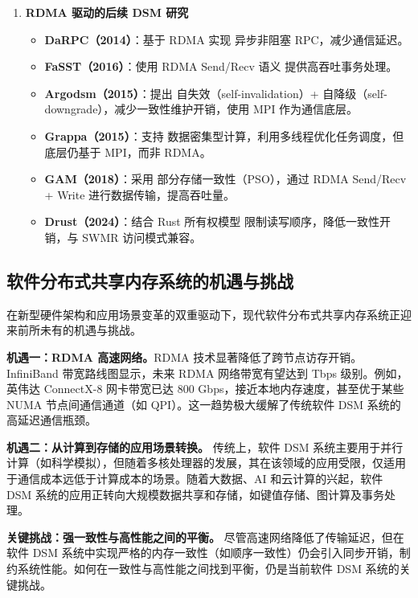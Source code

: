 {\begin{enumerate}[leftmargin=1em, align=left]
    \item \textbf{RDMA 驱动的后续 DSM 研究}

          \begin{itemize}
            \item \textbf{DaRPC（2014）}：基于 RDMA 实现 异步非阻塞 RPC，减少通信延迟。
            \item \textbf{FaSST（2016）}：使用 RDMA Send/Recv 语义 提供高吞吐事务处理。
            \item \textbf{Argodsm（2015）}：提出 自失效（self-invalidation）+ 自降级（self-downgrade），减少一致性维护开销，使用 MPI 作为通信底层。
            \item \textbf{Grappa（2015）}：支持 数据密集型计算，利用多线程优化任务调度，但底层仍基于 MPI，而非 RDMA。
            \item \textbf{GAM（2018）}：采用 部分存储一致性（PSO），通过 RDMA Send/Recv + Write 进行数据传输，提高吞吐量。
            \item \textbf{Drust（2024）}：结合 Rust 所有权模型 限制读写顺序，降低一致性开销，与 SWMR 访问模式兼容。
          \end{itemize}

  \end{enumerate}

  \subsection{软件分布式共享内存系统的机遇与挑战}
  在新型硬件架构和应用场景变革的双重驱动下，现代软件分布式共享内存系统正迎来前所未有的机遇与挑战。

  \textbf{机遇一：RDMA 高速网络。}RDMA 技术显著降低了跨节点访存开销。InfiniBand 带宽路线图显示，未来 RDMA 网络带宽有望达到 Tbps 级别。例如，英伟达 ConnectX-8 网卡带宽已达 800 Gbps，接近本地内存速度，甚至优于某些 NUMA 节点间通信通道（如 QPI）。这一趋势极大缓解了传统软件 DSM 系统的高延迟通信瓶颈。

  \textbf{机遇二：从计算到存储的应用场景转换。} 传统上，软件 DSM 系统主要用于并行计算（如科学模拟），但随着多核处理器的发展，其在该领域的应用受限，仅适用于通信成本远低于计算成本的场景。随着大数据、AI 和云计算的兴起，软件 DSM 系统的应用正转向大规模数据共享和存储，如键值存储、图计算及事务处理。

  \textbf{关键挑战：强一致性与高性能之间的平衡。} 尽管高速网络降低了传输延迟，但在软件 DSM 系统中实现严格的内存一致性（如顺序一致性）仍会引入同步开销，制约系统性能。如何在一致性与高性能之间找到平衡，仍是当前软件 DSM 系统的关键挑战。

}
